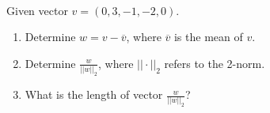 \documentclass[10pt]{article}
\begin{document}
\\
 Given vector $v=(0,3,-1,-2,0)$.
\begin{enumerate}
\item Determine $w=v-\overline{v}$, where $\overline{v}$ is the mean of $v$.
\item Determine $\frac{w}{||w||_2}$, where $||\cdot||_2$ refers to the 2-norm.
\item What is the length of vector $\frac{w}{||w||_2}$?
\end{enumerate}
\end{document}
